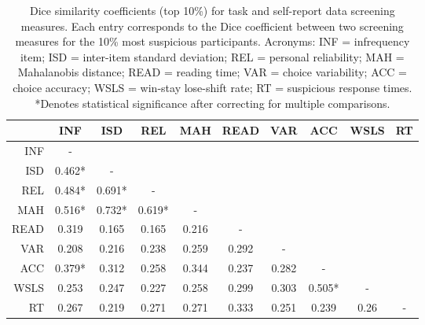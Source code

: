 \documentclass[a4paper,notitlepage,12pt]{article}
\begin{document}
\begin{table}[h!]
\centering
\small
\begin{tabular}{rccccccccc}
\toprule
{} &     INF &     ISD &     REL &    MAH &   READ &    VAR &     ACC &  WSLS & RT \\
\midrule
INF  &       - &         &         &        &        &        &         &       &    \\
ISD  &  0.462* &       - &         &        &        &        &         &       &    \\
REL  &  0.484* &  0.691* &       - &        &        &        &         &       &    \\
MAH  &  0.516* &  0.732* &  0.619* &      - &        &        &         &       &    \\
READ &   0.319 &   0.165 &   0.165 &  0.216 &      - &        &         &       &    \\
VAR  &   0.208 &   0.216 &   0.238 &  0.259 &  0.292 &      - &         &       &    \\
ACC  &  0.379* &   0.312 &   0.258 &  0.344 &  0.237 &  0.282 &       - &       &    \\
WSLS &   0.253 &   0.247 &   0.227 &  0.258 &  0.299 &  0.303 &  0.505* &     - &    \\
RT   &   0.267 &   0.219 &   0.271 &  0.271 &  0.333 &  0.251 &   0.239 &  0.26 &  - \\
\bottomrule
\end{tabular}
\captionsetup{width=0.88\textwidth}
\caption{Dice similarity coefficients (top 10\%) for task and self-report data screening measures. Each entry corresponds to the Dice coefficient between two screening measures for the 10\% most suspicious participants. Acronyms: INF = infrequency item; ISD = inter-item standard deviation; REL = personal reliability; MAH = Mahalanobis distance; READ = reading time; VAR = choice variability; ACC = choice accuracy; WSLS = win-stay lose-shift rate; RT = suspicious response times. *Denotes statistical significance after correcting for multiple comparisons.}
\end{table}
\end{document}
